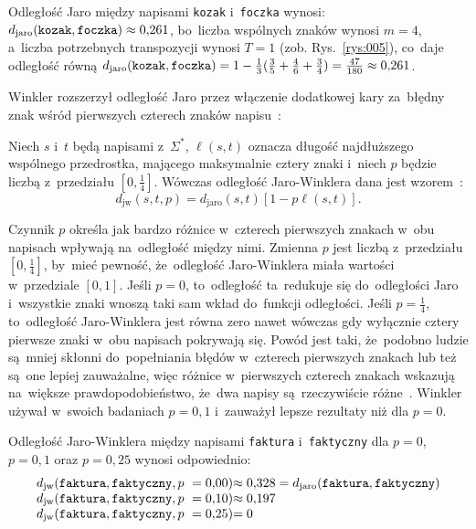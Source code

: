 \documentclass{praca1}
\begin{document}
\begin{example}
Odległość Jaro między napisami \verb|kozak| i~\verb|foczka| wynosi: $d_{\mathrm{jaro}}(\verb|kozak|, \verb|foczka|)  \approx 0{,}261$, bo~liczba wspólnych znaków wynosi $m = 4$, a~liczba potrzebnych transpozycji wynosi $T = 1$ (zob. Rys.~\ref{rys:005}), co~daje odległość równą $d_{\mathrm{jaro}}(\verb|kozak|, \verb|foczka|) = 1 - \frac{1}{3}(\frac{3}{5} + \frac{4}{6} + \frac{3}{4}) = \frac{47}{180} \approx 0{,}261$.
\end{example}



Winkler rozszerzył odległość Jaro przez włączenie dodatkowej kary za~błędny znak wśród pierwszych czterech znaków napisu~\cite{Loo2014:stringdist}:

\begin{definition}
Niech $s$ i~$t$ będą napisami z~$\Sigma^*$, $\ell(s,t)$ oznacza długość najdłuższego wspólnego przedrostka, mającego maksymalnie cztery znaki i~niech $p$ będzie liczbą z~przedziału $[0, \frac{1}{4}]$. Wówczas odległość Jaro-Winklera dana jest wzorem~\cite{Winkler1990:stringcomparator}:
\begin{equation}
\label{eq:012}
d_{\mathrm{jw}}(s,t, p) = d_{\mathrm{jaro}}(s,t)[1 - p\ell(s,t)].
\end{equation}
\end{definition}

Czynnik $p$ określa jak bardzo różnice w~czterech pierwszych znakach w~obu napisach wpływają na~odległość między nimi. Zmienna $p$ jest liczbą z~przedziału $[0, \frac{1}{4}]$, by~mieć pewność, że~odległość Jaro-Winklera miała wartości w~przedziale $[0,1]$. Jeśli $p=0$, to~odległość ta~redukuje się do~odległości Jaro i~wszystkie znaki wnoszą taki sam wkład do~funkcji odległości. Jeśli $p = \frac{1}{4}$, to~odległość Jaro-Winklera jest równa zero nawet wówczas gdy wyłącznie cztery pierwsze znaki w~obu napisach pokrywają się. Powód jest taki, że~podobno ludzie są~mniej skłonni do~popełniania błędów w~czterech pierwszych znakach lub też są~one lepiej zauważalne, więc różnice w~pierwszych czterech znakach wskazują na~większe prawdopodobieństwo, że~dwa napisy są~rzeczywiście różne~\cite{Loo2014:stringdist}. Winkler~\cite{Winkler1990:stringcomparator} używał w~swoich badaniach $p = 0{,}1$ i~zauważył lepsze rezultaty niż dla $p = 0$.

\begin{example}
Odległość Jaro-Winklera między napisami \verb|faktura| i~\verb|faktyczny| dla $p = 0$, $p = 0{,}1$ oraz $p = 0{,}25$ wynosi odpowiednio: 
\begin{equation*}
  \left.\begin{array}{l@{}l}
    d_{\mathrm{jw}}(\verb|faktura|, \verb|faktyczny|, p~= 0{,}00) & \approx 0{,}328 = d_{\mathrm{jaro}}(\verb|faktura|, \verb|faktyczny|) \\
    d_{\mathrm{jw}}(\verb|faktura|, \verb|faktyczny|, p~= 0{,}10) & \approx 0{,}197  \\
    d_{\mathrm{jw}}(\verb|faktura|, \verb|faktyczny|, p~= 0{,}25) & =  0
  \end{array}\right.
\end{equation*}
\end{example}
\end{document}
